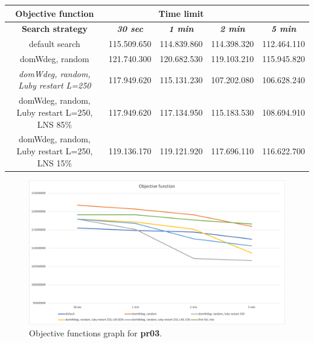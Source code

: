 {
\renewcommand{\arraystretch}{2}
\begin{longtable}[h]{| c | c | c | c | c |}
    \hline
    \textbf{Objective function} & \multicolumn{3}{c}{Time limit} & \\
    \hline
    \textbf{Search strategy} & \textbf{\textit{30 sec}} & \textbf{\textit{1 min}} & \textbf{\textit{2 min}} & \textbf{\textit{5 min}} \\
    \hline
    \endhead
    default search                                & 115.509.650 & 114.839.860 & 114.398.320 & 112.464.110 \\
    \hline
    domWdeg, random                               & 121.740.300 & 120.682.530 & 119.103.210 & 115.945.820 \\
    \hline
    \textit{domWdeg, random, Luby restart L=250}  & 117.949.620 & 115.131.230 & 107.202.080 & 106.628.240 \\
    \hline
    domWdeg, random, Luby restart L=250, LNS 85\% & 117.949.620 & 117.134.950 & 115.183.530 & 108.694.910 \\
    \hline
    domWdeg, random, Luby restart L=250, LNS 15\% & 119.136.170 & 119.121.920 & 117.696.110 & 116.622.700 \\
    \hline
\end{longtable}
}
\begin{figure}[H]
    \centering
    \includegraphics[width=0.8\columnwidth]{../graphs/pr03-objf.png}
    \caption{Objective functions graph for \textbf{pr03}.}
\end{figure}

